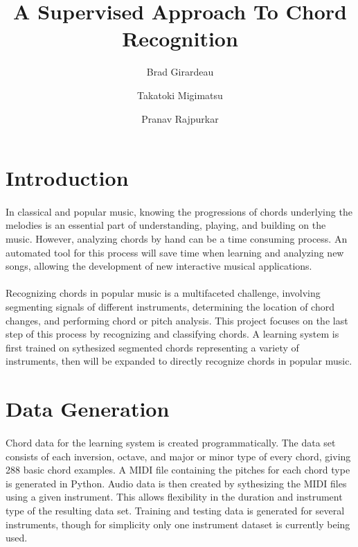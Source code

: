 \documentclass{article}
\title{A Supervised Approach To Chord Recognition}
\author{Brad Girardeau
\and      Takatoki Migimatsu
\and      Pranav Rajpurkar}
\begin{document}
\maketitle

\section{Introduction}
\paragraph{}
In classical and popular music, knowing the progressions of chords underlying the melodies is an essential
part of understanding, playing, and building on the music. However, analyzing chords by hand can be a time consuming process. An automated
tool for this process will save time when learning and analyzing new songs, allowing the development of new interactive musical applications.

\paragraph{}
Recognizing chords in popular music is a multifaceted challenge, involving segmenting signals of 
different instruments, determining the location of chord changes, and performing chord or pitch analysis. This
project focuses on the last step of this process by recognizing and classifying chords. A learning system is
first trained on sythesized segmented chords representing a variety of instruments, then will be expanded
to directly recognize chords in popular music. 

\section{Data Generation}
\paragraph{}
Chord data for the learning system is created programmatically. The data set consists of each inversion, octave,
and major or minor type of every chord, giving 288 basic chord examples. A MIDI file containing the pitches for each chord type is generated 
in Python. Audio data is then created by sythesizing the MIDI files using a given instrument. This allows flexibility in the duration
and instrument type of the resulting data set. Training and testing data is generated for several instruments, though for simplicity only
one instrument dataset is currently being used.
\end{document}
